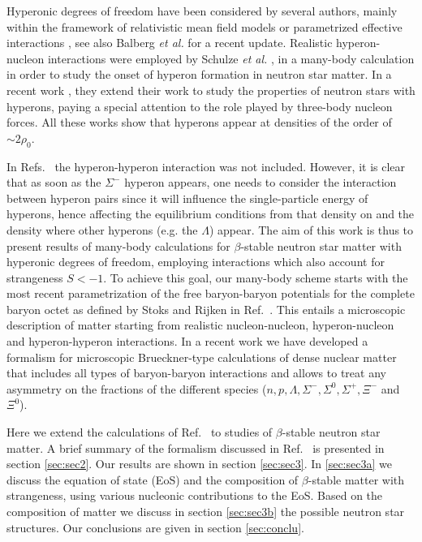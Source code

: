 Hyperonic degrees of freedom have been considered by several authors,
mainly within the framework of relativistic
mean field models \cite{prakash97,pke95,ms96} or parametrized
effective interactions \cite{bg97}, 
see also Balberg {\em et al.} \cite{blc99}
for a recent update. Realistic hyperon-nucleon interactions
were employed by Schulze {\em et al.} \cite{bbs98},
in a many-body calculation in order to study
the onset of hyperon formation in neutron star matter. In a recent
work \cite{bbs00}, they extend their work to study the properties
of neutron stars with hyperons, paying a special attention to the
role played by three-body nucleon forces. 
All these works show that hyperons appear at densities of the order of
$\sim 2\rho_0$.

In Refs.~\cite{bbs98,bbs00} the hyperon-hyperon interaction was not 
included. However, it is clear that
as soon as the $\Sigma^-$ hyperon appears, one needs to consider the 
interaction between hyperon pairs
since  
it will influence the single-particle energy of hyperons, hence affecting
the equilibrium conditions from that density on and the density
where other hyperons (e.g. the $\Lambda$) appear. 
The aim of this work is thus 
to present results of 
many-body calculations for $\beta$-stable neutron star matter
with hyperonic degrees of freedom,
employing interactions
which also account for strangeness $S < -1$.
To achieve this goal,
our many-body scheme starts with the most recent
parametrization
of the free baryon-baryon potentials
for the complete  baryon octet
as defined by Stoks and Rijken in Ref.\
\cite{sr99}. 
This entails a microscopic
description of matter starting from
realistic nucleon-nucleon, hyperon-nucleon
and hyperon-hyperon interactions.
In a recent work \cite{isaac99}
we have developed a formalism for microscopic
Brueckner-type calculations of dense nuclear
matter that includes all types of
baryon-baryon interactions and allows to treat
any asymmetry on the fractions of the
different species ($n, p, \Lambda, \Sigma^-, \Sigma^0, \Sigma^+,
\Xi^-$ and $\Xi^0$). 


Here we extend the calculations of Ref.\ \cite{isaac99}
to studies of $\beta$-stable neutron star matter.
A brief summary of the formalism
discussed in Ref.\ \cite{isaac99} is presented  
in section \ref{sec:sec2}. 
Our results are shown in section \ref{sec:sec3}. In
\ref{sec:sec3a} we discuss the
equation of state (EoS) and the composition of $\beta$-stable matter with
strangeness, using various nucleonic contributions to the EoS. 
Based on the composition of
matter we discuss in section \ref{sec:sec3b} the
possible neutron star structures. Our conclusions are given
in section \ref{sec:conclu}.

